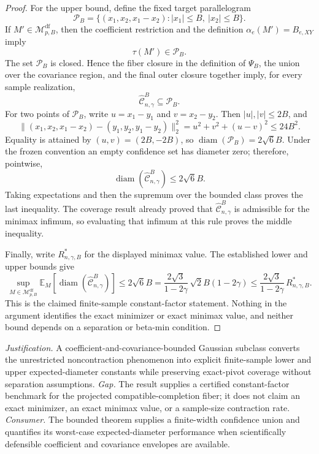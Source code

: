 \documentclass{article}
\begin{document}
\begin{proof}
For the upper bound, define the fixed target parallelogram
\[
\mathcal P_B
=\{(x_1,x_2,x_1-x_2): |x_1|\le B,\ |x_2|\le B\}.
\]
If \(M'\in\mathcal M_{p,B}^{\mathrm{df}}\), then the coefficient restriction and the definition \(\alpha_e(M')=B_{e,XY}\) imply
\[
\tau(M')\in\mathcal P_B.
\]
The set \(\mathcal P_B\) is closed.  Hence the fiber closure in the definition of \(\Psi_B\), the union over the covariance region, and the final outer closure together imply, for every sample realization,
\[
\widehat{\mathcal C}^{B}_{n,\gamma}\subseteq\mathcal P_B.
\]
For two points of \(\mathcal P_B\), write \(u=x_1-y_1\) and \(v=x_2-y_2\).  Then \(|u|,|v|\le2B\), and
\[
\|(x_1,x_2,x_1-x_2)-(y_1,y_2,y_1-y_2)\|_2^2
=u^2+v^2+(u-v)^2
\le24B^2.
\]
Equality is attained by \((u,v)=(2B,-2B)\), so \(\operatorname{diam}(\mathcal P_B)=2\sqrt6B\).  Under the frozen convention an empty confidence set has diameter zero; therefore, pointwise,
\[
\operatorname{diam}(\widehat{\mathcal C}^{B}_{n,\gamma})
\le2\sqrt6B.
\]
Taking expectations and then the supremum over the bounded class proves the last inequality.  The coverage result already proved that \(\widehat{\mathcal C}^{B}_{n,\gamma}\) is admissible for the minimax infimum, so evaluating that infimum at this rule proves the middle inequality.

Finally, write \(R^*_{n,\gamma,B}\) for the displayed minimax value.  The established lower and upper bounds give
\[
\sup_{M\in\mathcal M_{p,B}^{\mathrm{df}}}
\mathbb E_M[\operatorname{diam}(\widehat{\mathcal C}^{B}_{n,\gamma})]
\le2\sqrt6B
=\frac{2\sqrt3}{1-2\gamma}\,
  \sqrt2B(1-2\gamma)
\le\frac{2\sqrt3}{1-2\gamma}\,R^*_{n,\gamma,B}.
\]
This is the claimed finite-sample constant-factor statement.  Nothing in the argument identifies the exact minimizer or exact minimax value, and neither bound depends on a separation or beta-min condition.
\end{proof}
\par\smallskip\noindent \textit{Justification.} A coefficient-and-covariance-bounded Gaussian subclass converts the unrestricted noncontraction phenomenon into explicit finite-sample lower and upper expected-diameter constants while preserving exact-pivot coverage without separation assumptions. \textit{Gap.} The result supplies a certified constant-factor benchmark for the projected compatible-completion fiber; it does not claim an exact minimizer, an exact minimax value, or a sample-size contraction rate. \textit{Consumer.} The bounded theorem supplies a finite-width confidence union and quantifies its worst-case expected-diameter performance when scientifically defensible coefficient and covariance envelopes are available.
\end{document}
